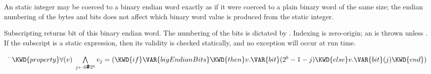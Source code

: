 
An static integer may be coerced to a binary endian word exactly as if
it were coerced to a plain binary word of the same size; the endian numbering
of the bytes and bits does not affect which binary word value is produced from
the static integer.



Subscripting returns bit  of this binary endian word.
The numbering of the bits is dictated by .
Indexing is zero-origin; an  is thrown unless .
If the subscript is a static expression, then its validity is checked statically,
and no exception will occur at run time.

\begin{Fortress}
{\tt~~}\pushtabs\=\+\(  \KWD{property} \forall(v)\; \bigwedge\limits_{j\leftarrow{}0\mathinner{\hbox{\tt\char'43}}2^{b}} v_j = (\KWD{if} \VAR{bigEndianBits} \KWD{then} v.\VAR{bit}(2^{b}-1-j) \KWD{else} v.\VAR{bit}(j) \KWD{end})\)\-\\\poptabs
\end{Fortress}


